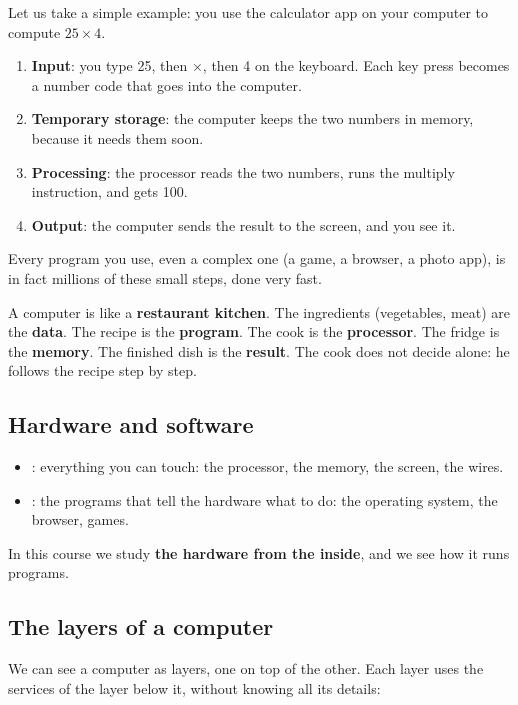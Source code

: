 Let us take a simple example: you use the calculator app on your computer to compute $25 \times 4$.
\begin{enumerate}
    \item \textbf{Input}: you type 25, then $\times$, then 4 on the keyboard. Each key press becomes a
          number code that goes into the computer.
    \item \textbf{Temporary storage}: the computer keeps the two numbers in memory, because it needs them soon.
    \item \textbf{Processing}: the processor reads the two numbers, runs the multiply instruction, and gets 100.
    \item \textbf{Output}: the computer sends the result to the screen, and you see it.
\end{enumerate}
Every program you use, even a complex one (a game, a browser, a photo app), is in fact millions of
these small steps, done very fast.

\begin{tashbih}
    A computer is like a \textbf{restaurant kitchen}. The ingredients (vegetables, meat) are the \textbf{data}.
    The recipe is the \textbf{program}. The cook is the \textbf{processor}. The fridge is the \textbf{memory}.
    The finished dish is the \textbf{result}. The cook does not decide alone: he follows the recipe step by step.
\end{tashbih}

\subsection{Hardware and software}
\begin{itemize}
    \item {}: everything you can touch: the processor, the memory, the screen, the wires.
    \item {}: the programs that tell the hardware what to do: the operating
          system, the browser, games.
\end{itemize}
In this course we study \textbf{the hardware from the inside}, and we see how it runs programs.

\subsection{The layers of a computer}
We can see a computer as layers, one on top of the other. Each layer uses the services of the layer
below it, without knowing all its details:


